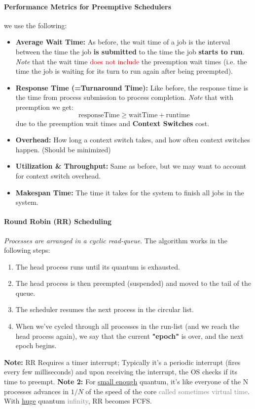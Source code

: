 \documentclass[openany,12pt]{book}
\newcommand{\red}[1]{\textcolor{Red}{#1}}
\newcommand{\gray}[1]{\textcolor{gray}{#1}}
\begin{document}
\paragraph{Performance Metrics for Preemptive Schedulers} we use the following:
\begin{itemize}
    \item \textbf{Average Wait Time:} As before, the wait time of a job is the interval between the time the job \textbf{is submitted} to the time the job \textbf{starts to run}. \textit{Note} that the wait time \red{does not include} the preemption wait times (i.e. the time the job is waiting for its turn to run again after being preempted).

    \item \textbf{Response Time (=Turnaround Time):} Like before, the response time is the time from process submission to process completion. \textit{Note} that with preemption we get:
          \begin{equation*}
              \text{responseTime} \geq \text{waitTime} + \text{runtime}
          \end{equation*}
          due to the preemption wait times and \textbf{Context Switches} cost.

    \item \textbf{Overhead:} How long a context switch takes, and how often context switches happen. (Should be minimized)

    \item \textbf{Utilization \& Throughput:} Same as before, but we may want to account for context switch overhead.

    \item \textbf{Makespan Time:} The time it takes for the system to finish all jobs in the system.

\end{itemize}


\paragraph{Round Robin (RR) Scheduling} \textit{Processes are arranged in a cyclic read-queue}. The algorithm works in the following steps:
\begin{enumerate}
    \item  The head process runs until its quantum is exhausted.
    \item The head process is then preempted (suspended) and moved to the tail of the queue.
    \item The scheduler resumes the next process in the circular list.
    \item When we've cycled through all processes in the run-list (and we reach the head process again), we say that the current \textbf{"epoch"} is over, and the next epoch begins.
\end{enumerate}
\textbf{Note:} RR Requires a timer interrupt; Typically it's a periodic interrupt (fires every few milliseconds) and upon receiving the interrupt, the OS checks if its time to preempt.
\textbf{Note 2:} For \ul{small enough} quantum, it's like everyone of the N processes advances in \(1/N\) of the speed of the core \gray{called sometimes virtual time}.
With \ul{huge} quantum \gray{infinity}, RR becomes FCFS.
\end{document}
